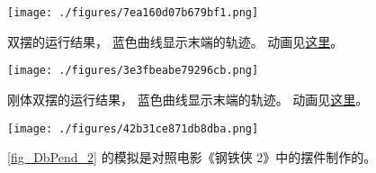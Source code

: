 
\begin{issues}
\issueDraft
\end{issues}


\begin{figure}[ht]
\centering
\texttt{[image: ./figures/7ea160d07b679bf1.png]}
\caption{双摆的运行结果， 蓝色曲线显示末端的轨迹。 动画见\href{https://wuli.wiki/apps/DbPend.html}{这里}。} \label{fig_DbPend_1}
\end{figure}

\begin{figure}[ht]
\centering
\texttt{[image: ./figures/3e3fbeabe79296cb.png]}
\caption{刚体双摆的运行结果， 蓝色曲线显示末端的轨迹。 动画见\href{https://wuli.wiki/apps/RigDbPend.html}{这里}。} \label{fig_DbPend_2}
\end{figure}

\begin{figure}[ht]
\centering
\texttt{[image: ./figures/42b31ce871db8dba.png]}
\caption{\autoref{fig_DbPend_2} 的模拟是对照电影《钢铁侠 2》中的摆件制作的。} \label{fig_DbPend_3}
\end{figure}


